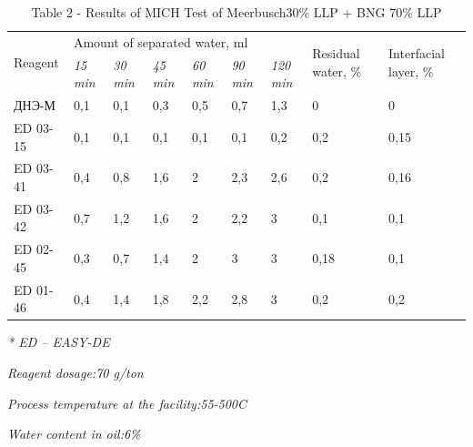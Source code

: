 \begin{table}[H]
\caption*{Table 2 - Results of MICH Test of Meerbusch30\% LLP + BNG 70\% LLP}
\centering
\begin{tabular}{|l|llllll|p{}|p{}|}
\hline
\multirow{2}{*}{Reagent} & \multicolumn{6}{l|}{Amount of separated water, ml} & \multirow{2}{=}{Residual water, \%} & \multirow{2}{=}{Interfacial layer, \%} \\ \cline{2-7}
 & \multicolumn{1}{l|}{\textit{15  min}} & \multicolumn{1}{l|}{\textit{30  min}} & \multicolumn{1}{l|}{\textit{45  min}} & \multicolumn{1}{l|}{\textit{60  min}} & \multicolumn{1}{l|}{\textit{90  min}} & \textit{120  min} &  &  \\ \hline
ДНЭ-М & \multicolumn{1}{l|}{0,1} & \multicolumn{1}{l|}{0,1} & \multicolumn{1}{l|}{0,3} & \multicolumn{1}{l|}{0,5} & \multicolumn{1}{l|}{0,7} & 1,3 & 0 & 0 \\ \hline
ED 03-15 & \multicolumn{1}{l|}{0,1} & \multicolumn{1}{l|}{0,1} & \multicolumn{1}{l|}{0,1} & \multicolumn{1}{l|}{0,1} & \multicolumn{1}{l|}{0,1} & 0,2 & 0,2 & 0,15 \\ \hline
ED 03-41 & \multicolumn{1}{l|}{0,4} & \multicolumn{1}{l|}{0,8} & \multicolumn{1}{l|}{1,6} & \multicolumn{1}{l|}{2} & \multicolumn{1}{l|}{2,3} & 2,6 & 0,2 & 0,16 \\ \hline
ED 03-42 & \multicolumn{1}{l|}{0,7} & \multicolumn{1}{l|}{1,2} & \multicolumn{1}{l|}{1,6} & \multicolumn{1}{l|}{2} & \multicolumn{1}{l|}{2,2} & 3 & 0,1 & 0,1 \\ \hline
ED 02-45 & \multicolumn{1}{l|}{0,3} & \multicolumn{1}{l|}{0,7} & \multicolumn{1}{l|}{1,4} & \multicolumn{1}{l|}{2} & \multicolumn{1}{l|}{3} & 3 & 0,18 & 0,1 \\ \hline
ED 01-46 & \multicolumn{1}{l|}{0,4} & \multicolumn{1}{l|}{1,4} & \multicolumn{1}{l|}{1,8} & \multicolumn{1}{l|}{2,2} & \multicolumn{1}{l|}{2,8} & 3 & 0,2 & 0,2 \\ \hline
\end{tabular}
\end{table}

\emph{* ED -- EASY-DE}

\emph{Reagent dosage:70 g/ton}

\emph{Process temperature at the facility:55-500C}

\emph{Water content in oil:6\%}

